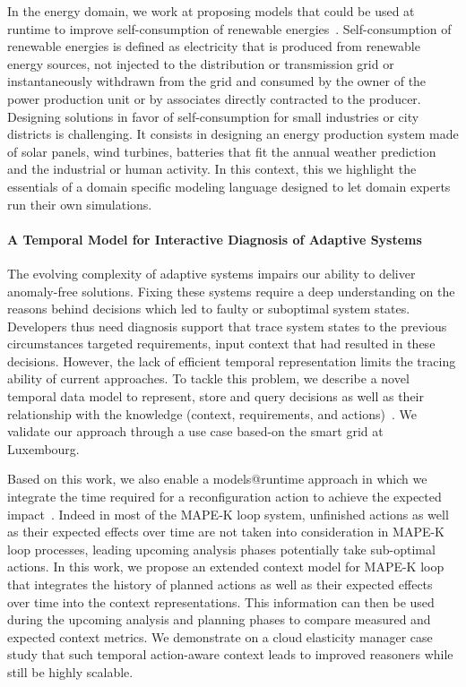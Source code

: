 In the energy domain, we work at proposing models that could be used at runtime to improve self-consumption of renewable energies~\cite{rio:hal-01913169}. Self-consumption of renewable energies is defined as electricity that is produced from renewable energy sources, not injected to the distribution or transmission grid or instantaneously withdrawn from the grid and consumed by the owner of the power production unit or by associates directly contracted to the producer. Designing solutions in favor of self-consumption for small industries or city districts is challenging. It consists in designing an energy production system made of solar panels, wind turbines, batteries that fit the annual weather prediction and the industrial or human activity. In this context, this we highlight the essentials of a domain specific modeling language designed to let domain experts run their own simulations. 


\paragraph{A Temporal Model for Interactive Diagnosis of Adaptive Systems}



The evolving complexity of adaptive systems impairs our ability to deliver anomaly-free solutions. Fixing these systems
require a deep understanding on the reasons behind decisions which led to faulty or suboptimal system states. Developers thus
need diagnosis support that trace system states to the previous circumstances targeted requirements, input context that had
resulted in these decisions. However, the lack of efficient temporal representation limits the tracing ability of current approaches. To tackle this problem, we describe a novel temporal data model to represent, store and query decisions as well as their relationship with the knowledge (context, requirements, and actions)~\cite{mouline:hal-01862964}. We validate our approach through a use case based-on the smart grid at Luxembourg.

Based on this work, we also enable a models@runtime approach in which we integrate the time required for a reconfiguration action to achieve the expected impact~\cite{mouline:hal-01723451}.
Indeed in most of the MAPE-K loop system, unfinished actions as well as their expected effects over time are not taken into consideration in MAPE-K loop processes, leading upcoming analysis phases potentially take sub-optimal actions. In this work, we propose an extended context model for MAPE-K loop that integrates the history of planned actions as well as their expected effects over time into the context representations. This information can then be used during the upcoming analysis and planning phases to compare measured and expected context metrics. We demonstrate on a cloud elasticity manager case study that such temporal action-aware context leads to improved reasoners while still be highly scalable.



